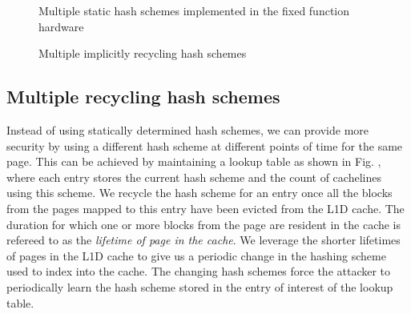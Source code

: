 \begin{figure}
  \caption{Multiple static hash schemes implemented in the fixed function hardware}
  \label{figure:multiple_schemes}
\end{figure}

\begin{figure}
  \caption{Multiple implicitly recycling hash schemes}
  \label{figure:changing_schemes}
\end{figure}

\subsection{Multiple recycling hash schemes}
Instead of using statically determined hash schemes, we can provide more security by using a different hash scheme at different points of time for the same page. This can be achieved by maintaining a lookup table as shown in Fig. \cite{figure:changing_schemes}, where each entry stores the current hash scheme and the count of cachelines using this scheme. We recycle the hash scheme for an entry once all the blocks from the pages mapped to this entry have been evicted from the L1D cache. The duration for which one or more blocks from the page are resident in the cache is refereed to as the \textit{lifetime of page in the cache}. We leverage the shorter lifetimes of pages in the L1D cache to give us a periodic change in the hashing scheme used to index into the cache. The changing hash schemes force the attacker to periodically learn the hash scheme stored in the entry of interest of the lookup table.


